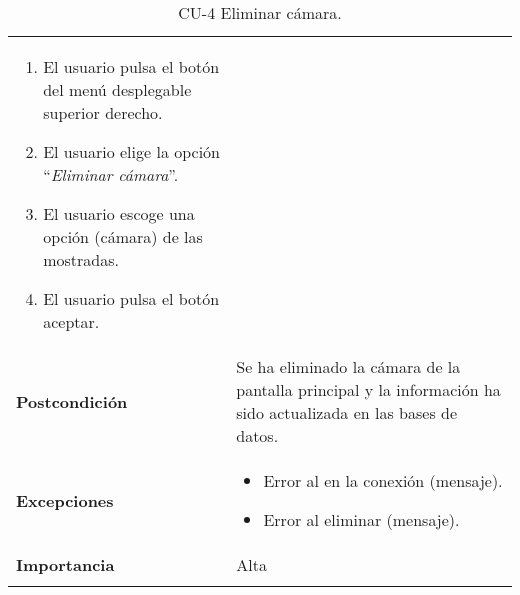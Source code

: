 \begin{longtable}[h!]{@{}ll@{}}
\begin{minipage}[t]{0.71\columnwidth}
\begin{enumerate}
\def\labelenumi{\arabic{enumi}.}
\tightlist
\item
  El usuario pulsa el botón del menú desplegable superior derecho.
\item
  El usuario elige la opción ``\textit{Eliminar cámara}''.
\item
  El usuario escoge una opción (cámara) de las mostradas.
\item
  El usuario pulsa el botón aceptar.
\end{enumerate}\strut
\end{minipage}\tabularnewline
\begin{minipage}[t]{0.23\columnwidth}\raggedright\strut
\textbf{Postcondición}\strut
\end{minipage} & \begin{minipage}[t]{0.71\columnwidth}\raggedright\strut
Se ha eliminado la cámara de la pantalla principal y la información ha sido actualizada en las bases de datos.\strut
\end{minipage}\tabularnewline
\begin{minipage}[t]{0.23\columnwidth}\raggedright\strut
\textbf{Excepciones}\strut
\end{minipage} & \begin{minipage}[t]{0.71\columnwidth}\raggedright\strut
\begin{itemize}
\tightlist
\item
  Error al en la conexión (mensaje).
\item
  Error al eliminar (mensaje).
\end{itemize}\strut
\end{minipage}\tabularnewline
\begin{minipage}[t]{0.23\columnwidth}\raggedright\strut
\textbf{Importancia}\strut
\end{minipage} & \begin{minipage}[t]{0.71\columnwidth}\raggedright\strut
Alta\strut
\end{minipage}\tabularnewline
\bottomrule
\caption{CU-4 Eliminar cámara.}
\end{longtable}


